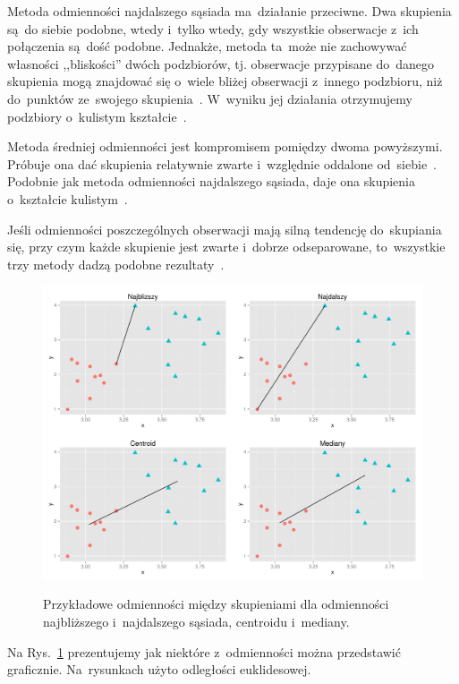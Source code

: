\documentclass{praca1}
\begin{document}
Metoda odmienności najdalszego sąsiada ma~działanie przeciwne. Dwa skupienia są~do siebie podobne, wtedy i~tylko wtedy, gdy wszystkie obserwacje z~ich połączenia są~dość podobne. Jednakże, metoda ta~może nie zachowywać własności ,,bliskości'' dwóch podzbiorów, tj. obserwacje przypisane do~danego skupienia mogą znajdować się o~wiele bliżej obserwacji z~innego podzbioru, niż do~punktów ze~swojego skupienia~\cite{Hastie2009:elements}. W~wyniku jej działania otrzymujemy podzbiory o~kulistym kształcie~\cite{Koronacki2005:statystyczne}.

Metoda średniej odmienności jest kompromisem pomiędzy dwoma powyższymi. Próbuje ona dać skupienia relatywnie zwarte i~względnie oddalone od~siebie~\cite{Hastie2009:elements}. Podobnie jak metoda odmienności najdalszego sąsiada, daje ona skupienia o~kształcie kulistym~\cite{Koronacki2005:statystyczne}.

Jeśli odmienności poszczególnych obserwacji mają silną tendencję do~skupiania się, przy czym każde skupienie jest zwarte i~dobrze odseparowane, to~wszystkie trzy metody dadzą podobne rezultaty~\cite{Hastie2009:elements}.

\begin{figure}[!h]
  \centering
  \includegraphics[width=450pt]{plot32.pdf}\\
  \caption{Przykładowe odmienności między skupieniami dla odmienności najbliższego i~najdalszego sąsiada, centroidu i~mediany.}\label{plot:008}
\end{figure}

Na Rys.~\ref{plot:008} prezentujemy jak niektóre z~odmienności można przedstawić graficznie. Na~rysunkach użyto odległości euklidesowej. 
\end{document}
